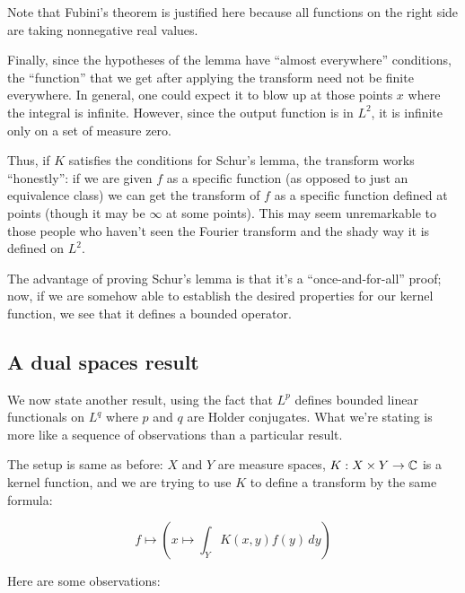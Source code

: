 \documentclass[a4paper]{amsart}
\begin{document}
Note that Fubini's theorem is justified here because all functions on
the right side are taking nonnegative real values.

Finally, since the hypotheses of the lemma have ``almost everywhere''
conditions, the ``function'' that we get after applying the transform
need not be finite everywhere. In general, one could expect it to blow
up at those points $x$ where the integral is infinite. However, since
the output function is in $L^2$, it is infinite only on a set of
measure zero.

Thus, if $K$ satisfies the conditions for Schur's lemma, the transform
works ``honestly'': if we are given $f$ as a specific function (as
opposed to just an equivalence class) we can get the transform of $f$
as a specific function defined at points (though it may be $\infty$ at
some points). This may seem unremarkable to those people who haven't
seen the Fourier transform and the shady way it is defined on $L^2$.

The advantage of proving Schur's lemma is that it's a
``once-and-for-all'' proof; now, if we are somehow able to establish
the desired properties for our kernel function, we see that it defines
a bounded operator.

\subsection{A dual spaces result}

We now state another result, using the fact that $L^p$ defines bounded
linear functionals on $L^q$ where $p$ and $q$ are Holder
conjugates. What we're stating is more like a sequence of observations
than a particular result.

The setup is same as before: $X$ and $Y$ are measure spaces, $K: X
\times Y \to \mathbb{C}$ is a kernel function, and we are trying to use $K$ to
define a transform by the same formula:

$$f \mapsto \left( x \mapsto \int_Y K(x,y)f(y) \, dy\right)$$

Here are some observations:
\end{document}
